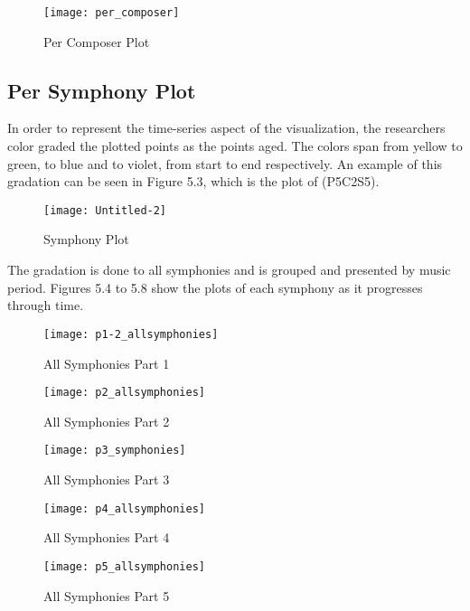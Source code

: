 \begin{figure}[!htb]
\caption{Per Composer Plot}
\centering
\texttt{[image: per\_composer]}
\end{figure}

\subsection{Per Symphony Plot}
In order to represent the time-series aspect of the visualization, the researchers color graded the plotted points as the points aged. The colors span from yellow to green, to blue and to violet, from start to end respectively. An example of this gradation can be seen in Figure 5.3, which is the plot of (P5C2S5).

\begin{figure}[!htb]
\caption{Symphony Plot}
\centering
\texttt{[image: Untitled-2]}
\end{figure}

The gradation is done to all symphonies and is grouped and presented by music period. Figures 5.4 to 5.8 show the plots of each symphony as it progresses through time. 

\begin{figure}[h]
\caption{All Symphonies Part 1}
\centering
\texttt{[image: p1-2\_allsymphonies]}
\end{figure}

\begin{figure}[h]
\caption{All Symphonies Part 2}
\centering
\texttt{[image: p2\_allsymphonies]}
\end{figure}

\begin{figure}[h]
\caption{All Symphonies Part 3}
\centering
\texttt{[image: p3\_symphonies]}
\end{figure}

\begin{figure}[h]
\caption{All Symphonies Part 4}
\centering
\texttt{[image: p4\_allsymphonies]}
\end{figure}

\begin{figure}[h]
\caption{All Symphonies Part 5}
\centering
\texttt{[image: p5\_allsymphonies]}
\end{figure}
